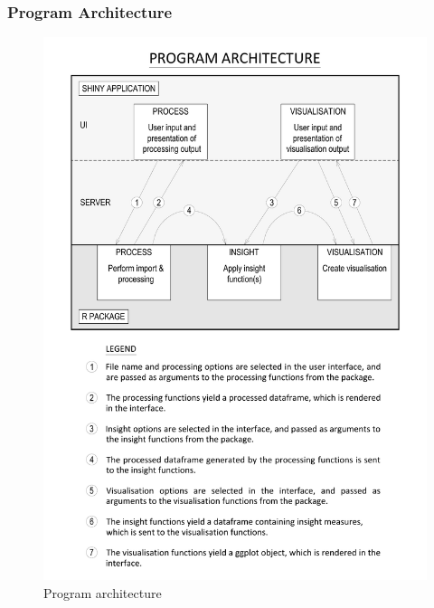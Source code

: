 \documentclass{beamer}
\begin{document}
\begin{frame}
  \frametitle{Program Architecture}
  \begin{figure}
  \centering \includegraphics[scale=0.4]{img/arch-expanded.pdf}
  \caption{Program architecture\label{fig:pr-arch}}
\end{figure}
\end{frame}
\end{document}
